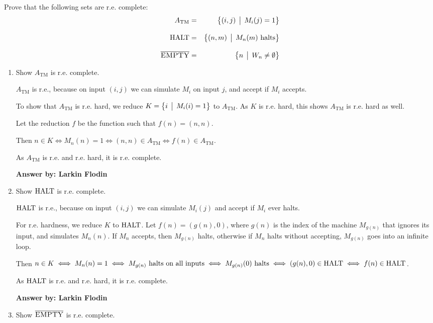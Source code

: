\documentclass[12pt]{article}
\begin{document}
\noindent{}
\addtocounter{section}{1}

Prove that the following sets are r.e. complete:
\begin{eqnarray*}
A_{\text{TM}} &=& \bigl\{ (i, j) \,\bigm|\, M_i(j) = 1 \bigr\} \\[2ex]
\mbox{{\rm HALT}} &=& \bigl\{ (n, m) \,\bigm|\, M_n(m) \mbox{ halts} \bigr\} \\[2ex]
\overline{\mbox{{\rm\sc EMPTY}}} &=& \bigl\{ n \,\bigm|\, W_n \neq \emptyset \bigr\}
\end{eqnarray*}

\begin{enumerate}
\item Show $A_{\text{TM}}$ is r.e. complete.

$A_{\text{TM}}$ is r.e., because on input $(i, j)$ we can simulate $M_i$ on input $j$, and accept if $M_i$ accepts.

To show that $A_{\text{TM}}$ is r.e. hard, we reduce $K = \bigl\{ i \,\bigm|\, M_i(i) = 1 \bigr\}$ to $A_{\text{TM}}$. As $K$ is r.e. hard, this shows $A_{\text{TM}}$ is r.e. hard as well.

Let the reduction $f$ be the function such that $f(n) = (n, n)$.

Then $n \in K \iff M_n(n) = 1 \iff (n, n) \in A_{\text{TM}} \iff f(n) \in A_{\text{TM}}$.

As $A_{\text{TM}}$ is r.e. and r.e. hard, it is r.e. complete.

{\bf Answer by: Larkin Flodin} 

\item Show $\mbox{{\rm HALT}}$ is r.e. complete.

$\mbox{{\rm HALT}}$ is r.e., because on input $(i, j)$ we can simulate $M_i(j)$ and accept if $M_i$ ever halts.

For r.e. hardness, we reduce $K$ to $\mbox{{\rm HALT}}$. Let $f(n) = (g(n), 0)$, where $g(n)$ is the index of the machine $M_{g(n)}$ that ignores its input, and simulates $M_n(n)$. If $M_n$ accepts, then $M_{g(n)}$ halts, otherwise if $M_n$ halts without accepting, $M_{g(n)}$ goes into an infinite loop.

Then $n \in K \iff M_n(n) = 1 \iff M_{g(n)} \textrm{ halts on all inputs} \iff M_{g(n)}(0) \textrm{ halts} \iff (g(n), 0) \in \mbox{{\rm HALT}} \iff f(n) \in \mbox{{\rm HALT}}$.

As $\mbox{{\rm HALT}}$ is r.e. and r.e. hard, it is r.e. complete.

{\bf Answer by: Larkin Flodin} 

\item Show $\overline{\mbox{{\rm\sc EMPTY}}}$ is r.e. complete.


\end{enumerate}
\end{document}
